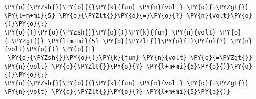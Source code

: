 \begin{Verbatim}[commandchars=\\\{\}]
\PY{o}{\PYZsh{}}\PY{o}{(}\PY{k}{fun} \PY{n}{volt} \PY{o}{=\PYZgt{}} \PY{l+m+mi}{5} \PY{o}{\PYZlt{}}\PY{o}{=}\PY{o}{?} \PY{n}{volt}\PY{o}{)}\PY{o}{;}
\PY{o}{(}\PY{o}{\PYZsh{}}\PY{o}{(}\PY{k}{fun} \PY{n}{volt} \PY{o}{=\PYZgt{}} \PY{l+m+mi}{5} \PY{o}{\PYZlt{}}\PY{o}{=}\PY{o}{?} \PY{n}{volt}\PY{o}{)} \PY{o}{|}
 \PY{o}{\PYZsh{}}\PY{o}{(}\PY{k}{fun} \PY{n}{volt} \PY{o}{=\PYZgt{}} \PY{n}{volt} \PY{o}{\PYZlt{}}\PY{o}{?} \PY{l+m+mi}{5}\PY{o}{)}\PY{o}{)}\PY{o}{;}
\PY{o}{\PYZsh{}}\PY{o}{(}\PY{k}{fun} \PY{n}{volt} \PY{o}{=\PYZgt{}} \PY{n}{volt} \PY{o}{\PYZlt{}}\PY{o}{?} \PY{l+m+mi}{5}\PY{o}{)}
\end{Verbatim}
